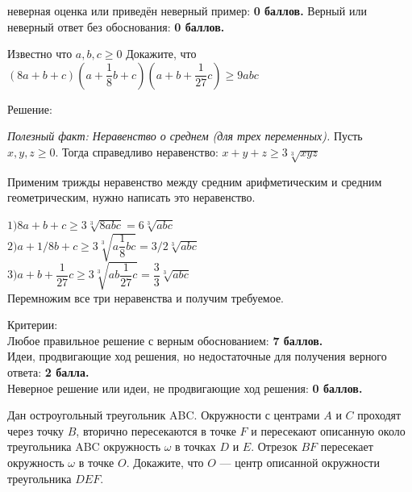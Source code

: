 \newpage

\hspace{3mm}

 неверная оценка или приведён неверный пример: \textbf{0 баллов.}
Верный или неверный ответ без обоснования: \textbf{0 баллов.} 

\hspace{3mm}

Известно что $a, b, c \geq 0$
Докажите, что $(8a + b + c)(a + \dfrac{1}{8}b + c)(a + b + \dfrac{1}{27} c ) \geq 9abc$

\hspace{3mm}

Решение:

\textit{Полезный факт: Неравенство о среднем (для трех переменных).} Пусть $x, y, z \geq 0.$ Тогда справедливо неравенство:
$x+y+z \geq 3\sqrt[3]{xyz}$

Применим трижды неравенство между средним арифметическим и средним геометрическим, нужно написать это неравенство.

\noindent$1) 8a + b + c \geq 3\sqrt[3]{8abc} = 6 \sqrt[3]{abc}$\\
$2) a + 1/8b + c \geq 3\sqrt[3]{a \dfrac{1}{8} b  c} = 3/2 \sqrt[3]{abc}$\\
$3) a + b + \dfrac{1}{27}c \geq 3\sqrt[3]{ab \dfrac{1}{27}c} = \dfrac{3}{3}\sqrt[3]{abc}$\\

Перемножим все три неравенства и получим требуемое.

\hspace{3mm}

Критерии:\\
Любое правильное решение с верным обоснованием: \textbf{7 баллов.}\\
Идеи, продвигающие ход решения, но недостаточные для получения верного ответа: \textbf{2 балла.}\\
Неверное решение или идеи, не продвигающие ход решения: \textbf{0 баллов.}

\hspace{3mm}

Дан остроугольный треугольник ABC. Окружности с центрами $A$ и $C$ проходят через точку
$B$, вторично пересекаются в точке $F$ и пересекают описанную около треугольника ABC окружность $\omega$
в точках $D$ и $E$. Отрезок $BF$ пересекает окружность $\omega$ в точке $O$. Докажите, что $O$ — центр описанной
окружности треугольника $DEF$.

\hspace{3mm}

